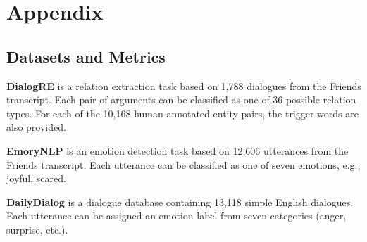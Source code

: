 \clearpage
\appendix

\section{Appendix}
\subsection{Datasets and Metrics}\label{ap:exp_setups}

\textbf{DialogRE} \citep{yu-etal-2020-dialogue} is a relation extraction task based on 1,788 dialogues from the Friends transcript. Each pair of arguments can be classified as one of 36 possible relation types. For each of the 10,168 human-annotated entity pairs, the trigger words are also provided. %

\textbf{EmoryNLP} \citep{zahiri:18a} is an emotion detection task based on 12,606 utterances from the Friends transcript. Each utterance can be classified as one of seven emotions, e.g., joyful, scared. 

\textbf{DailyDialog} \citep{DailyDialog} is a dialogue database containing 13,118 simple English dialogues. Each utterance can be assigned an emotion label from seven categories (anger, surprise, etc.). 

